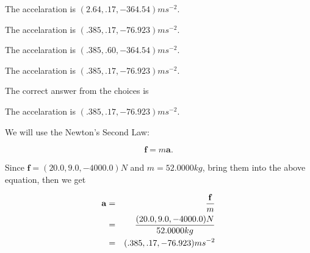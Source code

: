 \documentclass[12pt]{article}
\begin{document}
 
The accelaration is $  %
(
2.64,
.17,
-364.54)
ms^{-2} $.
 
 
The accelaration is $  %
(
.385,
.17,
-76.923)
ms^{-2} $.
 
 
The accelaration is $  %
(
.385,
.60,
-364.54)
ms^{-2} $.
 
 
\noindent{}
 
 
The accelaration is $  %
(
.385,
.17,
-76.923)
ms^{-2} $.
 
 
\noindent{}
 
 
 
 
 
\noindent{}
 
 

The correct answer from the choices is


The accelaration is $  %
(
.385,
.17,
-76.923)
ms^{-2} $.
 
 
 
\noindent{}
 
 

 
 
 
\noindent{}
 
 

We will use the Newton's Second Law:
 
\[
\mathbf{f}=m\mathbf{a}.
\]
 
Since $\mathbf{f}= %
(20.0 , 9.0 , -4000.0) N$
and $m= %
52.0000kg$, bring them into the above equation, then we get
 
\begin{eqnarray*}
\mathbf{a}&=&\frac{\mathbf{f}}m  \\
&=&\frac{ %
(20.0 , 9.0 , -4000.0) N}{ %
52.0000kg}  \\
&=& %
(.385 , .17 , -76.923) ms^{-2}
\end{eqnarray*}
 
 
 
\noindent{}
 
\end{document}
